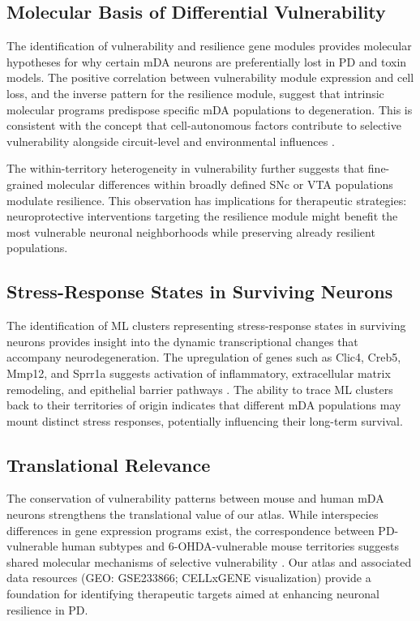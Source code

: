 \documentclass[12pt]{article}
\begin{document}
\subsection{Molecular Basis of Differential Vulnerability}

The identification of vulnerability and resilience gene modules provides molecular hypotheses for why certain mDA neurons are preferentially lost in PD and toxin models. The positive correlation between vulnerability module expression and cell loss, and the inverse pattern for the resilience module, suggest that intrinsic molecular programs predispose specific mDA populations to degeneration. This is consistent with the concept that cell-autonomous factors contribute to selective vulnerability alongside circuit-level and environmental influences \citep{surmeier2017selective, fu2018selective}.

The within-territory heterogeneity in vulnerability further suggests that fine-grained molecular differences within broadly defined SNc or VTA populations modulate resilience. This observation has implications for therapeutic strategies: neuroprotective interventions targeting the resilience module might benefit the most vulnerable neuronal neighborhoods while preserving already resilient populations.

\subsection{Stress-Response States in Surviving Neurons}

The identification of ML clusters representing stress-response states in surviving neurons provides insight into the dynamic transcriptional changes that accompany neurodegeneration. The upregulation of genes such as Clic4, Creb5, Mmp12, and Sprr1a suggests activation of inflammatory, extracellular matrix remodeling, and epithelial barrier pathways \citep{bhatt2013ion, miles2019stress}. The ability to trace ML clusters back to their territories of origin indicates that different mDA populations may mount distinct stress responses, potentially influencing their long-term survival.

\subsection{Translational Relevance}

The conservation of vulnerability patterns between mouse and human mDA neurons strengthens the translational value of our atlas. While interspecies differences in gene expression programs exist, the correspondence between PD-vulnerable human subtypes and 6-OHDA-vulnerable mouse territories suggests shared molecular mechanisms of selective vulnerability \citep{kamath2022single}. Our atlas and associated data resources (GEO: GSE233866; CELLxGENE visualization) provide a foundation for identifying therapeutic targets aimed at enhancing neuronal resilience in PD.
\end{document}
